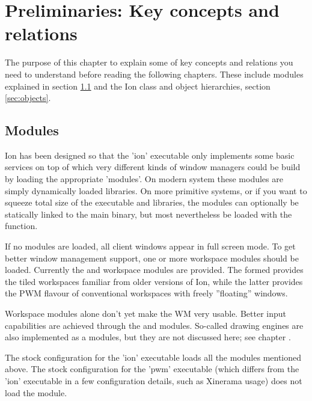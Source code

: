 
\chapter{Preliminaries: Key concepts and relations}
\label{chap:prelim}

The purpose of this chapter to explain some of key concepts and
relations you need to understand before reading the following
chapters. These include modules explained in section \ref{sec:modules}
and the Ion class and object hierarchies, section \ref{sec:objects}.


\section{Modules}
\label{sec:modules}

Ion has been designed so that the 'ion' executable only implements some
basic services on top of which very different kinds of window managers
could be build by loading the appropriate 'modules'. On modern system
these modules are simply dynamically loaded  libraries. On 
more primitive systems, or if you want to squeeze total size of the 
executable and libraries, the modules can optionally be statically 
linked to the main binary, but most nevertheless be loaded with the
 function.

If no modules are loaded, all client windows appear in full screen mode.
To get better window management support, one or more workspace modules
should be loaded. Currently the  and 
workspace modules are provided. The formed provides the tiled workspaces 
familiar from older versions of Ion, while the latter provides the PWM
flavour of conventional workspaces with freely ''floating'' windows.

Workspace modules alone don't yet make the WM very usable. Better
input capabilities are achieved through the  and 
modules. So-called drawing engines are also implemented as a modules,
but they are not discussed here; see chapter \label{chap:gr}.

The stock configuration for the 'ion' executable loads all the modules
mentioned above. The stock configuration for the 'pwm' executable (which
differs from the 'ion' executable in a few configuration details, such
as Xinerama usage) does not load the  module.



